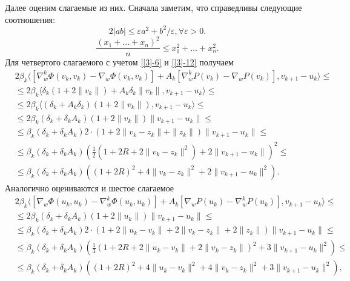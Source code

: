 Далее оценим слагаемые из них. Сначала заметим, что справедливы следующие соотношения:
\begin{equation}
\label{2|ab|}
2|ab|\leqslant \varepsilon a^2+b^2/\varepsilon,\forall\varepsilon>0.
\end{equation}
\begin{equation}
\label{An<=Qn}
\frac{(x_1+...+x_n)^2}{n}\leqslant x_1^2+\ldots+x_n^2.
\end{equation}
Для четвертого слагаемого с учетом \eqref{[3]-6} и \eqref{[3]-12} получаем
\begin{equation}
\label{[3]-41}
\begin{aligned}
&2\beta_k\big\langle [\nabla_w^k\Phi(v_k,v_k)-\nabla_w\Phi(v_k,v_k)]+A_k[\nabla_w^kP(v_k)-\nabla_wP(v_k)],v_{k+1}-u_k\big\rangle\leqslant \\
&\leqslant 2\beta_k\big\langle \delta_k(1+2\|v_k\|)+A_k\delta_k\|v_k\|,v_{k+1}-u_k\big\rangle\leqslant \\
&\leqslant 2\beta_k\big\langle (\delta_k+A_k\delta_k)(1+2\|v_k\|),v_{k+1}-u_k\big\rangle\leqslant\\
&\leqslant 2\beta_k(\delta_k+\delta_kA_k)(1+2\|v_k\|)\|v_{k+1}-u_k\|\leqslant\\
&\leqslant\beta_k(\delta_k+\delta_kA_k)2\cdot(1+2\|v_k-z_k\|+\|z_k\|)\|v_{k+1}-u_k\|\leqslant\\
&\leqslant\beta_k(\delta_k+\delta_kA_k)(\frac{1}{2}(1+2R+2\|v_k-z_k\|^2)+2\|v_{k+1}-u_k\|)^2\leqslant\\
&\leqslant\beta_k(\delta_k+\delta_kA_k)((1+2R)^2+4\|v_k-z_k\|^2+2\|v_{k+1}-u_k\|^2).
\end{aligned}
\end{equation}
Аналогично оцениваются и шестое слагаемое
\begin{equation}
\label{[3]-42}
\begin{aligned}
&2\beta_k\big\langle [\nabla_w\Phi(u_k,u_k)-\nabla_w^k\Phi(u_k,u_k)]+A_k[\nabla_wP(u_k)-\nabla_w^kP(u_k)],v_{k+1}-u_k\big\rangle\leqslant\\
&\leqslant 2\beta_k(\delta_k+\delta_kA_k)(1+2\|u_k\|)\|v_{k+1}-u_k\|\leqslant\\
&\leqslant \beta_k (\delta_k+\delta_kA_k)2\cdot(1+2\|u_k-v_k\|+2\|v_k-z_k\|+2\|z_k\|)\|v_{k+1}-u_k\|\leqslant\\
&\leqslant\beta_k (\delta_k+\delta_kA_k)(\frac{1}{3}(1+2R+2\|u_k-v_k\|+2\|v_k-z_k\|)^2+3\|v_{k+1}-u_k\|^2)\leqslant\\
&\leqslant\beta_k (\delta_k+\delta_kA_k)((1+2R)^2+4\|u_k-v_k\|^2+4\|v_k-z_k\|^2+3\|v_{k+1}-u_k\|^2),
\end{aligned}
\end{equation}
